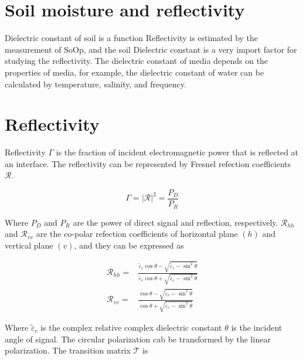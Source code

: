 \documentclass[draftcls]{IEEEtran}
\begin{document}
\section{Soil moisture and reflectivity}
Dielectric constant of soil is a function Reflectivity is estimated by the measurement of SoOp, and the soil Dielectric constant is a very import factor for studying the reflectivity. The dielectric constant of media depends on the properties of media, for example, the dielectric constant of water can be calculated by temperature, salinity, and frequency.
\section{Reflectivity}

Reflectivity $\Gamma$ is the fraction of incident electromagnetic power that is reflected at an interface. The reflectivity can be represented by Fresnel refection coefficients $\mathcal{R}$.

\begin{equation}
\Gamma = |\mathcal{R}|^2=\frac{P_D}{P_R}
\end{equation}

Where $P_D$ and $P_R$ are the power of direct signal and reflection, respectively. $\mathcal{R}_{hh}$ and $\mathcal{R}_{vv}$ are the co-polar refection coefficients of horizontal plane $(h)$ and vertical plane $(v)$, and they can be expressed as

\begin{equation} 
\begin{split}
	{\mathcal{R}_{hh}} = {}& \frac{{{{\tilde \varepsilon }_r}\cos \theta  - \sqrt 				{{{\tilde \varepsilon }_r} - {{\sin }^2}\theta } }}{{{{\tilde \varepsilon}_r}				\cos \theta  + \sqrt {{{\tilde \varepsilon }_r} - {{\sin }^2}\theta }}}
\\
	{\mathcal{R}_{vv}} = {}& \frac{{\cos \theta  - \sqrt {{{\tilde \varepsilon }_r} - {{\sin }^2}\theta } }}{{\cos \theta  + \sqrt {{{\tilde \varepsilon }_r} - {{\sin }^2}\theta }}} 
    \end{split}
     \label{Eq: reflectivity_di}
\end{equation}

Where $\tilde{\varepsilon}_r$ is the complex relative complex dielectric constant  $\theta$ is the incident angle of signal. The circular polarization cab be transformed by the linear polarization. The transition matrix $\mathcal{T}$ is
\end{document}
